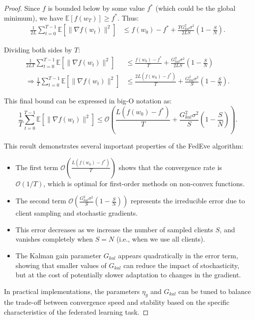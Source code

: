 \begin{proof}
    Since \(f\) is bounded below by some value \(f^*\) (which could be the global minimum), we have \(\mathbb{E}[f(w_T)] \geq f^*\). Thus:
    \begin{align*}
        \frac{1}{2L} \sum_{t=0}^{T-1} \mathbb{E}[\|\nabla f(w_t)\|^2] &\leq f(w_0) - f^* + \frac{T G_{kal}^2 \sigma^2}{2LS} \left(1 - \frac{S}{N}\right).
    \end{align*}
    
    Dividing both sides by \(T\):
    \begin{align*}
        \frac{1}{2LT} \sum_{t=0}^{T-1} \mathbb{E}[\|\nabla f(w_t)\|^2] &\leq \frac{f(w_0) - f^*}{T} + \frac{G_{kal}^2 \sigma^2}{2LS} \left(1 - \frac{S}{N}\right) \\
        \Rightarrow \frac{1}{T} \sum_{t=0}^{T-1} \mathbb{E}[\|\nabla f(w_t)\|^2] &\leq \frac{2L(f(w_0) - f^*)}{T} + \frac{G_{kal}^2 \sigma^2}{S} \left(1 - \frac{S}{N}\right).
    \end{align*}
    
    This final bound can be expressed in big-O notation as:
    \[
        \frac{1}{T} \sum_{t=0}^{T-1} \mathbb{E}[\|\nabla f(w_t)\|^2] \leq \mathcal{O}\left(\frac{L(f(w_0) - f^*)}{T} + \frac{G_{kal}^2 \sigma^2}{S} \left(1 - \frac{S}{N}\right)\right).
    \]
    
    This result demonstrates several important properties of the FedEve algorithm:
    \begin{itemize}
        \item The first term \(\mathcal{O}\left(\frac{L(f(w_0) - f^*)}{T}\right)\) shows that the convergence rate is \(\mathcal{O}(1/T)\), which is optimal for first-order methods on non-convex functions.
        \item The second term \(\mathcal{O}\left(\frac{G_{kal}^2 \sigma^2}{S} \left(1 - \frac{S}{N}\right)\right)\) represents the irreducible error due to client sampling and stochastic gradients.
        \item This error decreases as we increase the number of sampled clients \(S\), and vanishes completely when \(S = N\) (i.e., when we use all clients).
        \item The Kalman gain parameter \(G_{kal}\) appears quadratically in the error term, showing that smaller values of \(G_{kal}\) can reduce the impact of stochasticity, but at the cost of potentially slower adaptation to changes in the gradient.
    \end{itemize}
    
    In practical implementations, the parameters \(\eta_g\) and \(G_{kal}\) can be tuned to balance the trade-off between convergence speed and stability based on the specific characteristics of the federated learning task.
\end{proof}